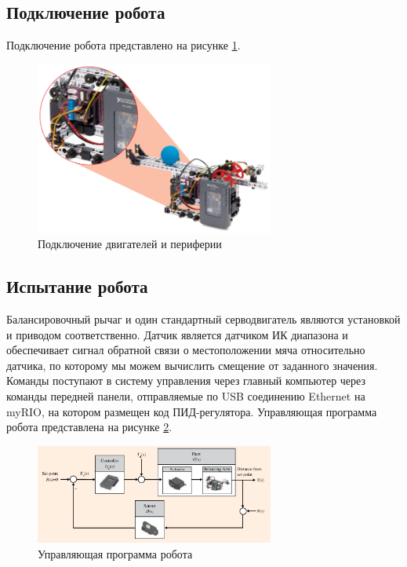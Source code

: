 \newpage
\subsection{Подключение робота}
Подключение робота представлено на рисунке \ref{2connect}.
\begin{figure}[h]
    \centering
    \includegraphics[width=0.7\textwidth]{fig/assembly/2.7.png}
    \caption{Подключение двигателей и периферии}
    \label{2connect}
\end{figure}

\subsection{Испытание робота}
Балансировочный рычаг и один стандартный серводвигатель являются установкой и приводом соответственно. Датчик является
датчиком ИК диапазона и обеспечивает сигнал обратной связи о местоположении мяча относительно датчика, по которому мы можем вычислить
смещение от заданного значения. Команды поступают в систему управления через главный компьютер через
команды передней панели, отправляемые по USB соединению Ethernet на myRIO, на котором размещен код ПИД-регулятора.
Управляющая программа робота представлена на рисунке \ref{2prog}.
\begin{figure}[h]
    \centering
    \includegraphics[width=0.7\textwidth]{fig/assembly/2.8.png}
    \caption{Управляющая программа робота}
    \label{2prog}
\end{figure}


